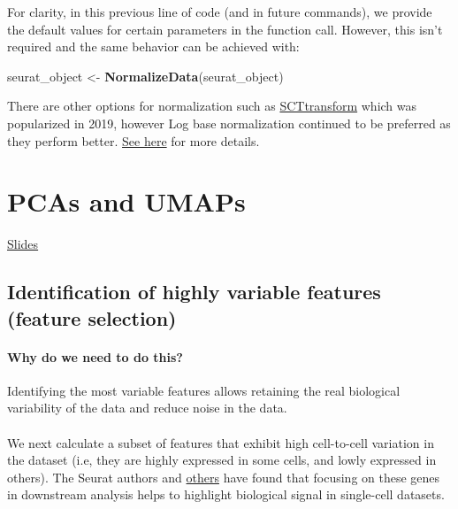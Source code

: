 \documentclass[
]{book}
\newenvironment{Shaded}{\begin{snugshade}}{\end{snugshade}}
\newcommand{\FunctionTok}[1]{\textcolor[rgb]{0.13,0.29,0.53}{\textbf{#1}}}
\newcommand{\NormalTok}[1]{#1}
\newcommand{\OtherTok}[1]{\textcolor[rgb]{0.56,0.35,0.01}{#1}}
\begin{document}
For clarity, in this previous line of code (and in future commands), we provide the default values for certain parameters in the function call. However, this isn't required and the same behavior can be achieved with:

\begin{Shaded}
\begin{Highlighting}[]
\NormalTok{seurat\_object }\OtherTok{\textless{}{-}} \FunctionTok{NormalizeData}\NormalTok{(seurat\_object)}
\end{Highlighting}
\end{Shaded}

There are other options for normalization such as \href{https://genomebiology.biomedcentral.com/articles/10.1186/s13059-019-1874-1}{SCTtransform} which was popularized in 2019, however Log base normalization continued to be preferred as they perform better. \href{https://www.nature.com/articles/s41592-023-01814-1}{See here} for more details.

\chapter{PCAs and UMAPs}\label{reducedims}

\href{https://docs.google.com/presentation/d/17-AYqsosmKnJFgv_7DHYNbMQFIXrGAP4/edit\#slide=id.p1}{Slides}

\section{Identification of highly variable features (feature selection)}\label{identification-of-highly-variable-features-feature-selection}

\subsubsection*{Why do we need to do this?}\label{why-do-we-need-to-do-this-2}

Identifying the most variable features allows retaining the real biological variability of the data and reduce noise in the data.

\subsubsection*{}\label{section-5}

We next calculate a subset of features that exhibit high cell-to-cell variation in the dataset (i.e, they are highly expressed in some cells, and lowly expressed in others). The Seurat authors and \href{https://www.nature.com/articles/nmeth.2645}{others} have found that focusing on these genes in downstream analysis helps to highlight biological signal in single-cell datasets.
\end{document}
